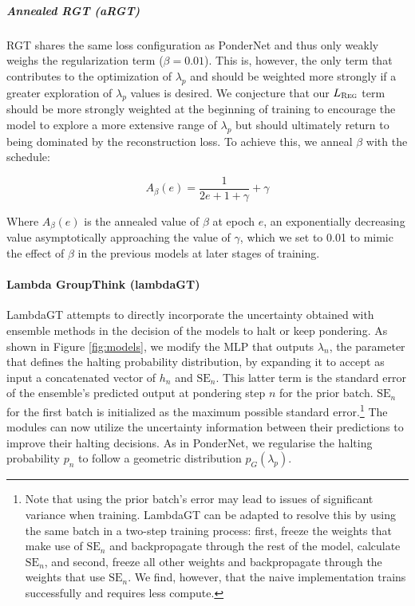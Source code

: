 \documentclass{article}
\begin{document}
\subparagraph{Annealed RGT (aRGT)} RGT shares the same loss configuration as PonderNet and thus only weakly weighs the regularization term ($\beta=0.01$). This is, however, the only term that contributes to the optimization of $\lambda_p$ and should be weighted more strongly if a greater exploration of $\lambda_p$ values is desired. We conjecture that our $L_{\textsc{Reg}}$ term should be more strongly weighted at the beginning of training to encourage the model to explore a more extensive range of $\lambda_p$ but should ultimately return to being dominated by the reconstruction loss. To achieve this, we anneal $\beta$ with the schedule:

\begin{equation}
    A_\beta(e) = \frac{1}{2e + 1 + \gamma} + \gamma
\end{equation}

Where $A_\beta(e)$ is the annealed value of $\beta$ at epoch $e$, an exponentially decreasing value asymptotically approaching the value of $\gamma$, which we set to 0.01 to mimic the effect of $\beta$ in the previous models at later stages of training.

\paragraph{Lambda GroupThink (lambdaGT)} LambdaGT attempts to directly incorporate the uncertainty obtained with ensemble methods in the decision of the models to halt or keep pondering. As shown in Figure \ref{fig:models}, we modify the MLP that outputs $\lambda_n$, the parameter that defines the halting probability distribution, by expanding it to accept as input a concatenated vector of $h_n$ and $\text{SE}_n$. This latter term is the standard error of the ensemble's predicted output at pondering step $n$ for the prior batch. $\text{SE}_n$ for the first batch is initialized as the maximum possible standard error.\footnote{Note that using the prior batch's error may lead to issues of significant variance when training. LambdaGT can be adapted to resolve this by using the same batch in a two-step training process: first, freeze the weights that make use of $\text{SE}_n$ and backpropagate through the rest of the model, calculate $\text{SE}_n$, and second, freeze all other weights and backpropagate through the weights that use $\text{SE}_n$. We find, however, that the naive implementation trains successfully and requires less compute.} The modules can now utilize the uncertainty information between their predictions to improve their halting decisions. As in PonderNet, we regularise the halting probability $p_n$ to follow a geometric distribution $p_G(\lambda_p)$.
\end{document}
